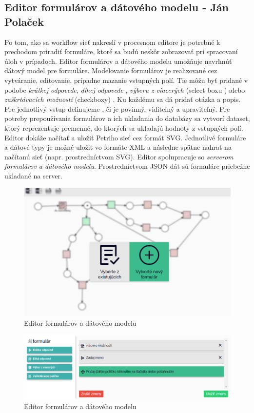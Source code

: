 \subsection{Editor formulárov a dátového modelu - Ján Polaček}
\label{editor formulárov}
Po tom, ako sa workflow sieť nakreslí v procesnom editore je potrebné k prechodom priradiť formuláre, ktoré sa budú neskôr zobrazovať pri spracovaní úloh v prípadoch. Editor formulárov a dátového modelu umožňuje navrhnúť dátový model pre formuláre. Modelovanie formulárov je realizované cez vytváranie, editovanie, prípadne mazanie vstupných polí. Tie môžu byť pridané v podobe \emph{krátkej odpovede}, \emph{dlhej odpovede} , \emph{výberu z viacerých} (select boxu ) 	alebo \emph{zaškrtávacích možností } (checkboxy) . Ku každému sa dá pridať otázka a popis. Pre jednotlivý vstup definujeme , či je povinný, viditeľný a upraviteľný. Pre potreby prepoužívania formulárov a ich ukladania do databázy sa vytvorí dataset, ktorý reprezentuje premenné, do ktorých sa ukladajú hodnoty z vstupných polí. Editor dokáže načítať a uložiť Petriho sieť cez formát SVG. Jednotlivé formuláre a dátové typy je možné uložiť vo formáte XML a následne spätne nahrať na načítanú sieť (napr. prostredníctvom SVG). Editor spolupracuje so \emph{serverom formulárov a dátového modelu}. Prostredníctvom JSON dát sú formuláre priebežne ukladané na server.

\begin{figure}[h]
	\centering
	\includegraphics[width=0.7\linewidth]{images/jan1}
	\caption{Editor formulárov a dátového modelu}
	\label{fig:editor formulárov a dátového modelu}
\end{figure}


\begin{figure}[h]
	\centering
	\includegraphics[width=0.7\linewidth]{images/jan}
	\caption{Editor formulárov a dátového modelu}
	\label{fig:editor formulárov a dátového modelu}
\end{figure}


